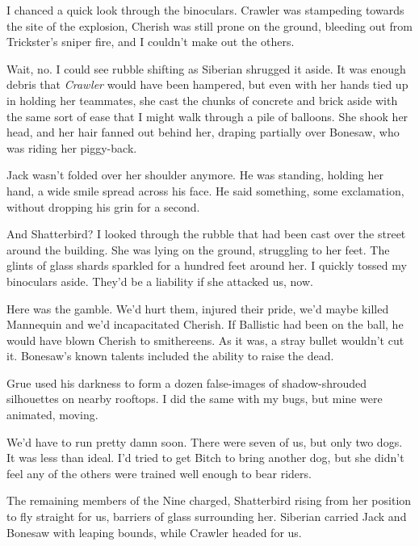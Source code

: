 I chanced a quick look through the binoculars.  Crawler was stampeding towards the site of the explosion, Cherish was still prone on the ground, bleeding out from Trickster's sniper fire, and I couldn't make out the others.



Wait, no.  I could see rubble shifting as Siberian shrugged it aside.  It was enough debris that \emph{Crawler} would have been hampered, but even with her hands tied up in holding her teammates, she cast the chunks of concrete and brick aside with the same sort of ease that I might walk through a pile of balloons.  She shook her head, and her hair fanned out behind her, draping partially over Bonesaw, who was riding her piggy-back.



Jack wasn't folded over her shoulder anymore.  He was standing, holding her hand, a wide smile spread across his face.  He said something, some exclamation, without dropping his grin for a second.



And Shatterbird?  I looked through the rubble that had been cast over the street around the building.  She was lying on the ground, struggling to her feet.  The glints of glass shards sparkled for a hundred feet around her.  I quickly tossed my binoculars aside.  They'd be a liability if she attacked us, now.



Here was the gamble.  We'd hurt them, injured their pride, we'd maybe killed Mannequin and we'd incapacitated Cherish.  If Ballistic had been on the ball, he would have blown Cherish to smithereens.  As it was, a stray bullet wouldn't cut it.  Bonesaw's known talents included the ability to raise the dead.



Grue used his darkness to form a dozen false-images of shadow-shrouded silhouettes on nearby rooftops.  I did the same with my bugs, but mine were animated, moving.



We'd have to run pretty damn soon.  There were seven of us, but only two dogs.  It was less than ideal.  I'd tried to get Bitch to bring another dog, but she didn't feel any of the others were trained well enough to bear riders.



The remaining members of the Nine charged, Shatterbird rising from her position to fly straight for us, barriers of glass surrounding her.  Siberian carried Jack and Bonesaw with leaping bounds, while Crawler headed for us.




